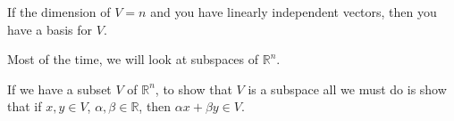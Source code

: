 
If the dimension of \( V = n \) and you have linearly independent vectors, then you have a basis for \( V \).

Most of the time, we will look at subspaces of \( \mathbb{R}^{n}  \).

\begin{note}
	If we have a subset \( V \) of \( \mathbb{R}^{n}  \), to show that \( V \) is a subspace all we must do is show that if \( x,y \in V \), \( \alpha ,\beta \in \mathbb{R} \), then \( \alpha x+\beta y \in V \).
\end{note}
